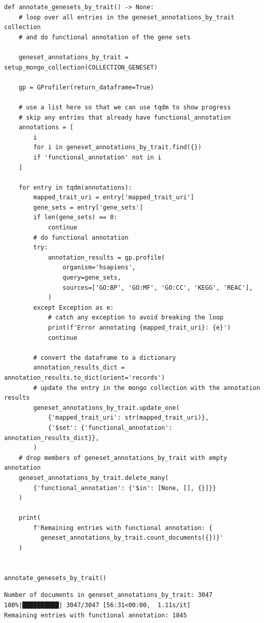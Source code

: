 \begin{lstlisting}[style=Python]
def annotate_genesets_by_trait() -> None:
    # loop over all entries in the geneset_annotations_by_trait collection
    # and do functional annotation of the gene sets

    geneset_annotations_by_trait = setup_mongo_collection(COLLECTION_GENESET)

    gp = GProfiler(return_dataframe=True)

    # use a list here so that we can use tqdm to show progress
    # skip any entries that already have functional_annotation
    annotations = [
        i
        for i in geneset_annotations_by_trait.find({})
        if 'functional_annotation' not in i
    ]

    for entry in tqdm(annotations):
        mapped_trait_uri = entry['mapped_trait_uri']
        gene_sets = entry['gene_sets']
        if len(gene_sets) == 0:
            continue
        # do functional annotation
        try:
            annotation_results = gp.profile(
                organism='hsapiens',
                query=gene_sets,
                sources=['GO:BP', 'GO:MF', 'GO:CC', 'KEGG', 'REAC'],
            )
        except Exception as e:
            # catch any exception to avoid breaking the loop
            print(f'Error annotating {mapped_trait_uri}: {e}')
            continue

        # convert the dataframe to a dictionary
        annotation_results_dict = annotation_results.to_dict(orient='records')
        # update the entry in the mongo collection with the annotation results
        geneset_annotations_by_trait.update_one(
            {'mapped_trait_uri': str(mapped_trait_uri)},
            {'$set': {'functional_annotation': annotation_results_dict}},
        )
    # drop members of geneset_annotations_by_trait with empty annotation
    geneset_annotations_by_trait.delete_many(
        {'functional_annotation': {'$in': [None, [], {}]}}
    )

    print(
        f'Remaining entries with functional annotation: {
          geneset_annotations_by_trait.count_documents({})}'
    )


annotate_genesets_by_trait()
\end{lstlisting}

\begin{lstlisting}[style=shell, numbers=none]
Number of documents in geneset_annotations_by_trait: 3047
100%|██████████| 3047/3047 [56:31<00:00,  1.11s/it] 
Remaining entries with functional annotation: 1845
\end{lstlisting}

